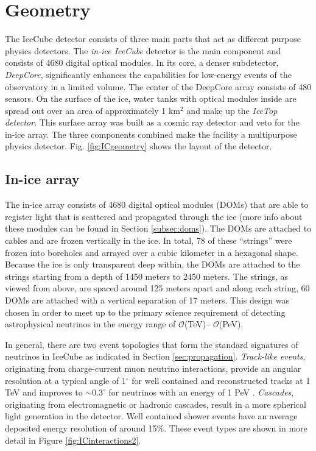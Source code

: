 \section{Geometry}
The IceCube detector consists of three main parts that act as different purpose physics detectors. 
The \textit{in-ice IceCube} detector is the main component and consists of 4680 digital optical modules. In its core, a denser subdetector, \textit{DeepCore}, significantly enhances the capabilities for low-energy events of the observatory in a limited volume. The center of the DeepCore array consists of 480 sensors.
On the surface of the ice, water tanks with optical modules inside are spread out over an area of approximately 1 km$^2$ and make up the \textit{IceTop detector}. This surface array was built as a cosmic ray detector and veto for the in-ice array.  The three components combined make the facility a multipurpose physics detector. Fig. \ref{fig:ICgeometry} shows the layout of the detector.

\subsection{In-ice array}
The in-ice array consists of 4680 digital optical modules (DOMs) that are able to register light that is scattered and propagated through the ice (more info about these modules can be found in Section \ref{subsec:doms}). The DOMs are attached to cables and are frozen vertically in the ice. In total, 78 of these ``strings'' were frozen into boreholes and arrayed over a cubic kilometer in a hexagonal shape. Because the ice is only transparent deep within, the DOMs are attached to the strings starting from a depth of 1450 meters to 2450 meters. The strings, as viewed from above, are spaced around 125 meters apart and along each string, 60 DOMs are attached with a vertical separation of 17 meters. This design was chosen
in order to meet up to the primary science requirement of detecting astrophysical neutrinos in the energy range of $\mathcal{O}$(TeV)– $\mathcal{O}$(PeV).

In general, there are two event topologies that form the standard signatures of neutrinos in IceCube as indicated in Section \ref{sec:propagation}. \textit{Track-like events}, originating from charge-current muon neutrino interactions, provide an angular resolution at a typical angle of 1$^\circ$ for well contained and reconstructed tracks at 1 TeV and improves to $\sim 0.3^\circ$ for neutrinos with an energy of 1 PeV \cite{Binnenkort gepubliceerd}
. \textit{Cascades}, originating from electromagnetic or hadronic cascades, result in a more spherical light generation in the detector. Well contained shower events have an average deposited energy resolution of around 15\%. These event types are shown in more detail in Figure \ref{fig:ICinteractions2}.
 

